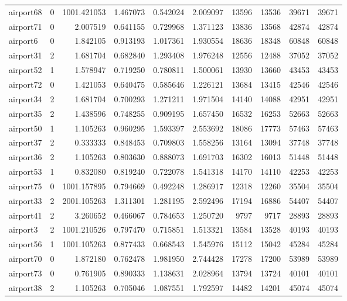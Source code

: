 \begin{longtable}{|l|r|r|r|r|r|r|r|r|r|}
airport68 & 0 & 1001.421053 & 1.467073 & 0.542024 & 2.009097 & 13596 & 13536 & 39671 & 39671 \\
airport71 & 0 & 2.007519 & 0.641155 & 0.729968 & 1.371123 & 13836 & 13568 & 42874 & 42874 \\
airport6 & 0 & 1.842105 & 0.913193 & 1.017361 & 1.930554 & 18636 & 18348 & 60848 & 60848 \\
airport31 & 2 & 1.681704 & 0.682840 & 1.293408 & 1.976248 & 12556 & 12488 & 37052 & 37052 \\
airport52 & 1 & 1.578947 & 0.719250 & 0.780811 & 1.500061 & 13930 & 13660 & 43453 & 43453 \\
airport72 & 0 & 1.421053 & 0.640475 & 0.585646 & 1.226121 & 13684 & 13415 & 42546 & 42546 \\
airport34 & 2 & 1.681704 & 0.700293 & 1.271211 & 1.971504 & 14140 & 14088 & 42951 & 42951 \\
airport35 & 2 & 1.438596 & 0.748255 & 0.909195 & 1.657450 & 16532 & 16253 & 52663 & 52663 \\
airport50 & 1 & 1.105263 & 0.960295 & 1.593397 & 2.553692 & 18086 & 17773 & 57463 & 57463 \\
airport37 & 2 & 0.333333 & 0.848453 & 0.709803 & 1.558256 & 13164 & 13094 & 37748 & 37748 \\
airport36 & 2 & 1.105263 & 0.803630 & 0.888073 & 1.691703 & 16302 & 16013 & 51448 & 51448 \\
airport53 & 1 & 0.832080 & 0.819240 & 0.722078 & 1.541318 & 14170 & 14110 & 42253 & 42253 \\
airport75 & 0 & 1001.157895 & 0.794669 & 0.492248 & 1.286917 & 12318 & 12260 & 35504 & 35504 \\
airport33 & 2 & 2001.105263 & 1.311301 & 1.281195 & 2.592496 & 17194 & 16886 & 54407 & 54407 \\
airport41 & 2 & 3.260652 & 0.466067 & 0.784653 & 1.250720 & 9797 & 9717 & 28893 & 28893 \\
airport3 & 2 & 1001.210526 & 0.797470 & 0.715851 & 1.513321 & 13584 & 13528 & 40193 & 40193 \\
airport56 & 1 & 1001.105263 & 0.877433 & 0.668543 & 1.545976 & 15112 & 15042 & 45284 & 45284 \\
airport70 & 0 & 1.872180 & 0.762478 & 1.981950 & 2.744428 & 17278 & 17200 & 53989 & 53989 \\
airport73 & 0 & 0.761905 & 0.890333 & 1.138631 & 2.028964 & 13794 & 13724 & 40101 & 40101 \\
airport38 & 2 & 1.105263 & 0.705046 & 1.087551 & 1.792597 & 14482 & 14201 & 45074 & 45074 \\

\end{longtable}
